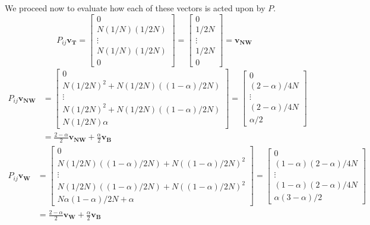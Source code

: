 \documentclass[11pt]{article}
\begin{document}
We proceed now to evaluate how each of these vectors is acted upon by $P$.
\begin{equation}
P_{ij}\mathbf{v_T} = \left[\begin{array}{c}
0\\N(1/N)(1/2N)\\\vdots\\N(1/N)(1/2N)\\0
\end{array}\right] = \left[\begin{array}{c}
0\\1/2N\\\vdots\\1/2N\\0
\end{array}\right]=\mathbf{v_{NW}}
\end{equation}
\begin{align}
P_{ij}\mathbf{v_{NW}} &= \left[\begin{array}{c}
0\\N(1/2N)^2 + N(1/2N)((1-\alpha)/2N)\\\vdots\\N(1/2N)^2 + N(1/2N)((1-\alpha)/2N)\\N(1/2N)\alpha
\end{array}\right] = \left[\begin{array}{c}
0\\(2-\alpha)/4N\\\vdots\\(2-\alpha)/4N\\\alpha/2
\end{array}\right]\\ 
&= \frac{2-\alpha}{2}\mathbf{v_{NW}} + \frac{\alpha}{2}\mathbf{v_B}
\end{align}
\begin{align}
P_{ij}\mathbf{v_{W}} &= \left[\begin{array}{c}
0\\N(1/2N)((1-\alpha)/2N) + N((1-\alpha)/2N)^2\\\vdots\\N(1/2N)((1-\alpha)/2N) + N((1-\alpha)/2N)^2\\N\alpha(1-\alpha)/2N + \alpha
\end{array}\right] = \left[\begin{array}{c}
0\\(1-\alpha)(2-\alpha)/4N\\\vdots\\(1-\alpha)(2-\alpha)/4N\\ \alpha(3-\alpha)/2
\end{array}\right]\\ 
&=\frac{2-\alpha}{2}\mathbf{v_W} + \frac{\alpha}{2}\mathbf{v_B}\label{eq:Pvw}
\end{align}
\end{document}
